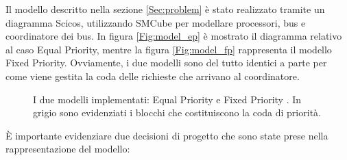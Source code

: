 Il modello descritto nella sezione \ref{Sec:problem} è stato realizzato tramite un diagramma Scicos, utilizzando SMCube per modellare processori, bus e coordinatore dei bus. In figura \ref{Fig:model_ep} è mostrato il diagramma relativo al caso Equal Priority, mentre la figura \ref{Fig:model_fp} rappresenta il modello Fixed Priority. Ovviamente, i due modelli sono del tutto identici a parte per come viene gestita la coda delle richieste che arrivano al coordinatore.

%

\begin{figure}
\vspace{-3cm}
\caption{I due modelli implementati: Equal Priority  e Fixed Priority . In grigio sono evidenziati i blocchi che costituiscono la coda di priorità.}
\label{Fig:models}
\end{figure}

È importante evidenziare due decisioni di progetto che sono state prese nella rappresentazione del modello:

